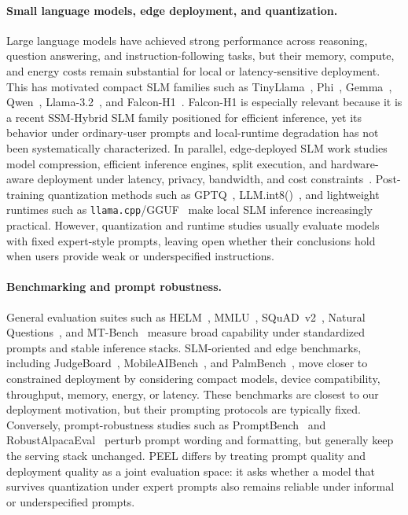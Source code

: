 \documentclass[letterpaper]{article} %
\begin{document}
\paragraph{Small language models, edge deployment, and quantization.}
Large language models have achieved strong performance across reasoning,
question answering, and instruction-following tasks, but their memory, compute,
and energy costs remain substantial for local or latency-sensitive deployment.
This has motivated compact SLM families such as TinyLlama~\cite{TinyLlama},
Phi~\cite{phi4}, Gemma~\cite{gemma2}, Qwen~\cite{qwen2025},
Llama-3.2~\cite{llama3}, and Falcon-H1~\cite{falconh1}. Falcon-H1 is especially
relevant because it is a recent SSM-Hybrid SLM family positioned for efficient
inference, yet its behavior under ordinary-user prompts and local-runtime
degradation has not been systematically characterized. In parallel,
edge-deployed SLM work studies model compression, efficient inference engines,
split execution, and hardware-aware deployment under latency, privacy,
bandwidth, and cost constraints~\cite{llm_edge,Mobileaibench,li2025palmbench}.
Post-training quantization methods such as GPTQ~\cite{gptq2022},
LLM.int8()~\cite{llmint8}, and lightweight runtimes such as
\texttt{llama.cpp}/GGUF~\cite{gguf} make local SLM inference increasingly
practical. However, quantization and runtime studies usually evaluate models
with fixed expert-style prompts, leaving open whether their conclusions hold
when users provide weak or underspecified instructions. 

\paragraph{Benchmarking and prompt robustness.}
General evaluation suites such as HELM~\cite{helm2022}, MMLU~\cite{mmlu2021},
SQuAD~v2~\cite{squad2}, Natural Questions~\cite{nqopen}, and
MT-Bench~\cite{mtbench2023} measure broad capability under standardized prompts
and stable inference stacks. SLM-oriented and edge benchmarks, including
JudgeBoard~\cite{smlbenchmark}, MobileAIBench~\cite{Mobileaibench}, and
PalmBench~\cite{li2025palmbench}, move closer to constrained deployment by
considering compact models, device compatibility, throughput, memory, energy,
or latency. These benchmarks are closest to our deployment motivation, but their
prompting protocols are typically fixed. Conversely, prompt-robustness studies
such as PromptBench~\cite{zhu2023promptrobust} and
RobustAlpacaEval~\cite{ralpaca2024} perturb prompt wording and formatting, but
generally keep the serving stack unchanged. PEEL differs by treating prompt
quality and deployment quality as a joint evaluation space: it asks whether a
model that survives quantization under expert prompts also remains reliable
under informal or underspecified prompts.
\end{document}

